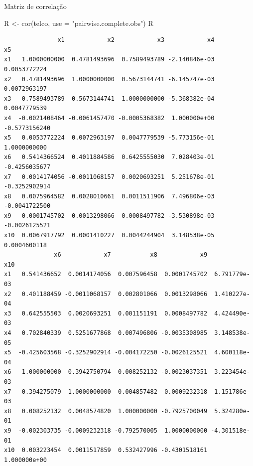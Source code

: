 \documentclass[
  ignorenonframetext,
  aspectratio=169,
]{beamer}
\newenvironment{Shaded}{\begin{snugshade}}{\end{snugshade}}
\newcommand{\AttributeTok}[1]{\textcolor[rgb]{0.40,0.45,0.13}{#1}}
\newcommand{\FunctionTok}[1]{\textcolor[rgb]{0.28,0.35,0.67}{#1}}
\newcommand{\NormalTok}[1]{\textcolor[rgb]{0.00,0.23,0.31}{#1}}
\newcommand{\OtherTok}[1]{\textcolor[rgb]{0.00,0.23,0.31}{#1}}
\newcommand{\StringTok}[1]{\textcolor[rgb]{0.13,0.47,0.30}{#1}}
\begin{document}
\begin{frame}[fragile]{Matriz de correlação}
\label{matriz-de-correlauxe7uxe3o}
\begin{Shaded}
\begin{Highlighting}[]
\NormalTok{R }\OtherTok{\textless{}{-}} \FunctionTok{cor}\NormalTok{(telco, }\AttributeTok{use =} \StringTok{"pairwise.complete.obs"}\NormalTok{)}
\NormalTok{R}
\end{Highlighting}
\end{Shaded}

\begin{verbatim}
               x1            x2            x3            x4            x5
x1   1.0000000000  0.4781493696  0.7589493789 -2.140846e-03  0.0053772224
x2   0.4781493696  1.0000000000  0.5673144741 -6.145747e-03  0.0072963197
x3   0.7589493789  0.5673144741  1.0000000000 -5.368382e-04  0.0047779539
x4  -0.0021408464 -0.0061457470 -0.0005368382  1.000000e+00 -0.5773156240
x5   0.0053772224  0.0072963197  0.0047779539 -5.773156e-01  1.0000000000
x6   0.5414366524  0.4011884586  0.6425555030  7.028403e-01 -0.4256035677
x7   0.0014174056 -0.0011068157  0.0020693251  5.251678e-01 -0.3252902914
x8   0.0075964582  0.0028010661  0.0011511906  7.496806e-03 -0.0041722500
x9   0.0001745702  0.0013298066  0.0008497782 -3.530898e-03 -0.0026125521
x10  0.0067917792  0.0001410227  0.0044244904  3.148538e-05  0.0004600118
              x6            x7           x8            x9           x10
x1   0.541436652  0.0014174056  0.007596458  0.0001745702  6.791779e-03
x2   0.401188459 -0.0011068157  0.002801066  0.0013298066  1.410227e-04
x3   0.642555503  0.0020693251  0.001151191  0.0008497782  4.424490e-03
x4   0.702840339  0.5251677868  0.007496806 -0.0035308985  3.148538e-05
x5  -0.425603568 -0.3252902914 -0.004172250 -0.0026125521  4.600118e-04
x6   1.000000000  0.3942750794  0.008252132 -0.0023037351  3.223454e-03
x7   0.394275079  1.0000000000  0.004857482 -0.0009232318  1.151786e-03
x8   0.008252132  0.0048574820  1.000000000 -0.7925700049  5.324280e-01
x9  -0.002303735 -0.0009232318 -0.792570005  1.0000000000 -4.301518e-01
x10  0.003223454  0.0011517859  0.532427996 -0.4301518161  1.000000e+00
\end{verbatim}
\end{frame}
\end{document}
